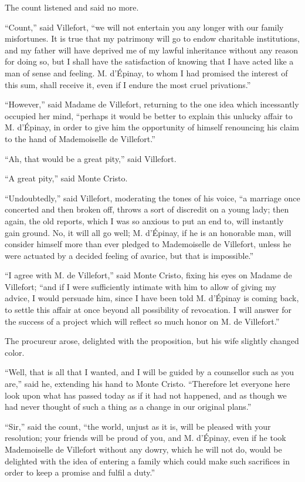 The count listened and said no more.

“Count,” said Villefort, “we will not entertain you any longer with our
family misfortunes. It is true that my patrimony will go to endow
charitable institutions, and my father will have deprived me of my
lawful inheritance without any reason for doing so, but I shall have
the satisfaction of knowing that I have acted like a man of sense and
feeling. M. d’Épinay, to whom I had promised the interest of this sum,
shall receive it, even if I endure the most cruel privations.”

“However,” said Madame de Villefort, returning to the one idea which
incessantly occupied her mind, “perhaps it would be better to explain
this unlucky affair to M. d’Épinay, in order to give him the
opportunity of himself renouncing his claim to the hand of Mademoiselle
de Villefort.”

“Ah, that would be a great pity,” said Villefort.

“A great pity,” said Monte Cristo.

“Undoubtedly,” said Villefort, moderating the tones of his voice, “a
marriage once concerted and then broken off, throws a sort of discredit
on a young lady; then again, the old reports, which I was so anxious to
put an end to, will instantly gain ground. No, it will all go well; M.
d’Épinay, if he is an honorable man, will consider himself more than
ever pledged to Mademoiselle de Villefort, unless he were actuated by a
decided feeling of avarice, but that is impossible.”

“I agree with M. de Villefort,” said Monte Cristo, fixing his eyes on
Madame de Villefort; “and if I were sufficiently intimate with him to
allow of giving my advice, I would persuade him, since I have been told
M. d’Épinay is coming back, to settle this affair at once beyond all
possibility of revocation. I will answer for the success of a project
which will reflect so much honor on M. de Villefort.”

The procureur arose, delighted with the proposition, but his wife
slightly changed color.

“Well, that is all that I wanted, and I will be guided by a counsellor
such as you are,” said he, extending his hand to Monte Cristo.
“Therefore let everyone here look upon what has passed today as if it
had not happened, and as though we had never thought of such a thing as
a change in our original plans.”

“Sir,” said the count, “the world, unjust as it is, will be pleased
with your resolution; your friends will be proud of you, and M.
d’Épinay, even if he took Mademoiselle de Villefort without any dowry,
which he will not do, would be delighted with the idea of entering a
family which could make such sacrifices in order to keep a promise and
fulfil a duty.”

